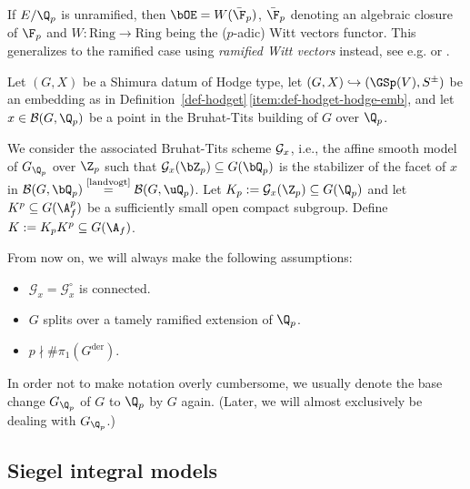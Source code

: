 \documentclass[a4paper]{scrartcl} %
\numberwithin{equation}{section}
\begin{document}
\begin{Remark}\label{ram-witt}
  If $E/\Q_p$ is unramified, then $\bOE=W(\bar\F_p)$, $\bar\F_p$ denoting an algebraic closure of $\F_p$ and $W\colon\mathrm{Ring}\to\mathrm{Ring}$ being the ($p$-adic) Witt vectors functor. This generalizes to the ramified case using \emph{ramified Witt vectors} instead, see e.g. \cite[Chap.~IV, (18.6.13)]{haze-fg} or \cite[Chapter~1]{ahsendorf}.
\end{Remark}

Let $(G,X)$ be a Shimura datum of Hodge type, let $(G,X)\hookrightarrow(\GSp(V),S^\pm)$ be an embedding as in Definition~\ref{def-hodget}\,\eqref{item:def-hodget-hodge-emb}, and let $x\in\mathcal{B}(G,\Q_p)$ be a point in the Bruhat-Tits building of $G$ over $\Q_p$.

We consider the associated Bruhat-Tits scheme ${\cal G}_x$, i.e., the affine smooth model of $G_{\Q_p}$ over $\Z_p$ such that ${\cal G}_x(\bZ_p)\subseteq G(\bQ_p)$ is the stabilizer of the facet of $x$ in ${\cal B}(G,\bQ_p)\overset{\text{\cite[Prop.~2.1.3]{landvogt}}}=\mathcal{B}(G,\uQ_p)$.
Let $K_p:={\cal G}_x(\Z_p)\subseteq G(\Q_p)$ and let $K^p\subseteq G(\A_f^p)$ be a sufficiently small open compact subgroup. Define $K:=K_pK^p\subseteq G(\A_f)$.

\begin{Assumptions}\label{std-assum}
  From now on, we will always make the following assumptions:
  \begin{itemize}
  \item $\mathcal{G}_x=\mathcal{G}_x^\circ$ is connected.
  \item $G$ splits over a tamely ramified extension of $\Q_p$.
  \item $p\nmid \#\pi_1(G^\mathrm{der})$.
  \end{itemize}
\end{Assumptions}


\begin{Notation}
  In order not to make notation overly cumbersome, we usually denote the base change $G_{\Q_p}$ of $G$ to $\Q_p$ by $G$ again.  (Later, we will almost exclusively be dealing with $G_{\Q_p}$.)
\end{Notation}



\subsection{Siegel integral models}
\label{sec:siegel-integr-model}
\end{document}
